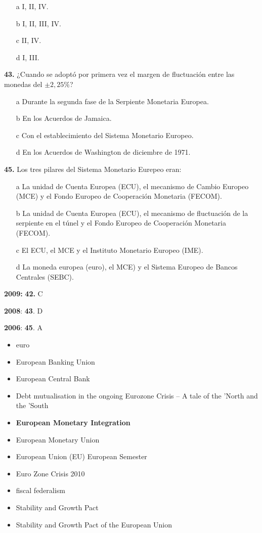 \documentclass{nuevotema}
\begin{document}
\begin{itemize}
	\item[a] I, II, IV.
	\item[b] I, II, III, IV.
	\item[c] II, IV.
	\item[d] I, III.
\end{itemize}


\textbf{43.} ¿Cuando se adoptó por primera vez el margen de fluctuación entre las monedas del $\pm 2,25\%$?
\begin{enumerate}
	\item[a] Durante la segunda fase de la Serpiente Monetaria Europea.
	\item[b] En los Acuerdos de Jamaica.
	\item[c] Con el establecimiento del Sistema Monetario Europeo.
	\item[d] En los Acuerdos de Washington de diciembre de 1971.
\end{enumerate}


\textbf{45.} Los tres pilares del Sistema Monetario Eurepeo eran:
\begin{enumerate}
	\item[a] La unidad de Cuenta Europea (ECU), el mecanismo de Cambio Europeo (MCE) y el Fondo Europeo de Cooperación Monetaria (FECOM).
	\item[b] La unidad de Cuenta Europea (ECU), el mecanismo de fluctuación de la serpiente en el túnel y el Fondo Europeo de Cooperación Monetaria (FECOM).
	\item[c] El ECU, el MCE y el Instituto Monetario Europeo (IME).
	\item[d] La moneda europea (euro), el MCE) y el Sistema Europeo de Bancos Centrales (SEBC).
\end{enumerate}

\notas

\textbf{2009:} \textbf{42.} C

\textbf{2008}: \textbf{43}. D

\textbf{2006}: \textbf{45}. A

\bibliografia

\begin{itemize}
	\item euro
	\item European Banking Union
	\item European Central Bank
    \item Debt mutualisation in the ongoing Eurozone Crisis -- A tale of the 'North and the 'South
	\item \textbf{European Monetary Integration}
	\item European Monetary Union
	\item European Union (EU) European Semester
	\item Euro Zone Crisis 2010
	\item fiscal federalism
	\item Stability and Growth Pact
	\item Stability and Growth Pact of the European Union
\end{itemize}
\end{document}
